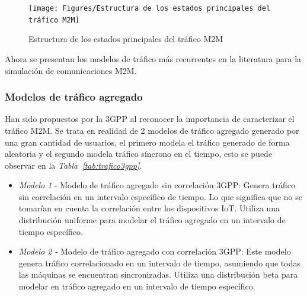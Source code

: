\begin{figure}[th]
\centering
\texttt{[image: Figures/Estructura de los estados principales del tráfico M2M]}
\decoRule
\caption[Estructura de los estados principales del tráfico M2M]{Estructura de los estados principales del tráfico M2M}
\label{fig:}
\end{figure}

Ahora se presentan los modelos de tráfico más recurrentes en la literatura para la simulación de comunicaciones M2M.\newline

\subsubsection{Modelos de tráfico agregado}

Han sido propuestos por la 3GPP al reconocer la importancia de caracterizar el tráfico M2M. Se trata en realidad de 2 modelos de tráfico agregado generado por una gran cantidad de usuarios, el primero modela el tráfico generado de forma aleatoria y el segundo modela tráfico síncrono en el tiempo, esto se puede observar en la \textit{Tabla~\ref{tab:trafico3gpp}}.\newline

\begin{itemize}
\item  \textit{Modelo 1} - Modelo de tráfico agregado sin correlación 3GPP: Genera tráfico sin correlación en un intervalo específico de tiempo. Lo que significa que no se tomarían en cuenta la correlación entre los dispositivos IoT. Utiliza una distribución uniforme para modelar el tráfico agregado en un intervalo de tiempo específico.
\item  \textit{Modelo 2 -} Modelo de tráfico agregado con correlación 3GPP: Este modelo genera tráfico correlacionado en un intervalo de tiempo, asumiendo que todas las máquinas se encuentran sincronizadas. Utiliza una distribución beta para modelar en tráfico agregado en un intervalo de tiempo específico.
\end{itemize}

